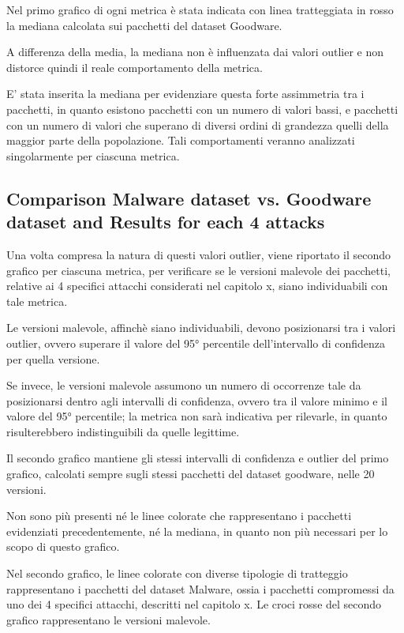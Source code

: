 Nel primo grafico di ogni metrica è stata indicata con linea tratteggiata in rosso la mediana
calcolata sui pacchetti del dataset Goodware.

A differenza della media, la mediana non è influenzata dai valori outlier e  
non distorce quindi il reale comportamento della metrica.

E' stata inserita la mediana per evidenziare questa forte assimmetria tra i pacchetti,
in quanto esistono pacchetti con un numero di valori bassi, e
pacchetti con un numero di valori che superano di diversi ordini di grandezza
quelli della maggior parte della popolazione.
Tali comportamenti veranno analizzati singolarmente per ciascuna metrica.


\subsection{Comparison Malware dataset vs. Goodware dataset and Results for each 4 attacks}

Una volta compresa la natura di questi valori outlier, 
viene riportato il secondo grafico per ciascuna metrica,
per verificare se le versioni malevole dei pacchetti, relative ai 4 specifici attacchi considerati
nel capitolo x, siano individuabili con tale metrica.

Le versioni malevole, affinchè siano individuabili, devono 
posizionarsi tra i valori outlier, ovvero superare 
il valore del 95° percentile dell'intervallo di confidenza per quella versione.

Se invece, le versioni malevole assumono un numero di 
occorrenze tale da posizionarsi dentro agli
intervalli di confidenza, ovvero tra il valore minimo e il valore del 95° percentile;
la metrica non sarà indicativa per rilevarle,
in quanto risulterebbero indistinguibili da quelle legittime.


Il secondo grafico mantiene gli stessi intervalli di confidenza 
e outlier del primo grafico, 
calcolati sempre sugli stessi pacchetti del dataset goodware, nelle 20 versioni.

Non sono più presenti né le linee colorate che rappresentano i pacchetti evidenziati precedentemente,
né la mediana, in quanto non più necessari per lo scopo di questo grafico.

Nel secondo grafico, le linee colorate con diverse tipologie di tratteggio
rappresentano i pacchetti del dataset Malware, ossia i pacchetti 
compromessi da uno dei 4 specifici attacchi,
descritti nel capitolo x.
Le croci rosse del secondo grafico rappresentano le versioni malevole.

